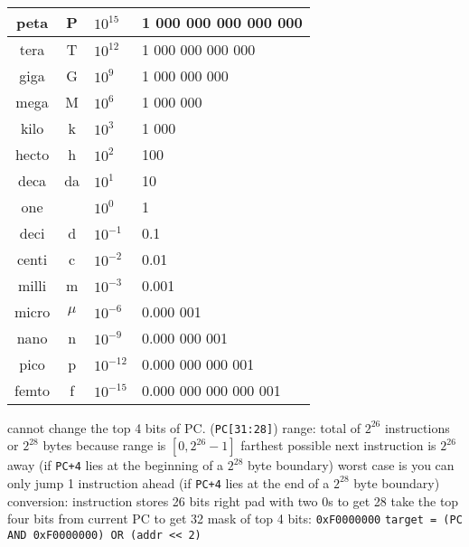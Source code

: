 \documentclass[12pt]{article}
\begin{document}
\begin{spacing}{0.9}
\begin{multicols*}{2}
\begin{flushleft}
\begin{outline}[longenum]
 \\
\begin{tabular}{|c c l l|}                                   \hline
peta  & P     & $10^{ 15}$ & \hfill 1 000 000 000 000 000 \\ \hline
tera  & T     & $10^{ 12}$ & \hfill     1 000 000 000 000 \\ \hline
giga  & G     & $10^{  9}$ & \hfill         1 000 000 000 \\ \hline
mega  & M     & $10^{  6}$ & \hfill             1 000 000 \\ \hline
kilo  & k     & $10^{  3}$ & \hfill                 1 000 \\ \hline
hecto & h     & $10^{  2}$ & \hfill                   100 \\ \hline
deca  & da    & $10^{  1}$ & \hfill                    10 \\ \hline
one   &       & $10^{ 0 }$ & \hfill       1 \hfill \hfill \\ \hline
deci  & d     & $10^{- 1}$ & 0.1                          \\ \hline
centi & c     & $10^{- 2}$ & 0.01                         \\ \hline
milli & m     & $10^{- 3}$ & 0.001                        \\ \hline
micro & $\mu$ & $10^{- 6}$ & 0.000 001                    \\ \hline
nano  & n     & $10^{- 9}$ & 0.000 000 001                \\ \hline
pico  & p     & $10^{-12}$ & 0.000 000 000 001            \\ \hline
femto & f     & $10^{-15}$ & 0.000 000 000 000 001        \\ \hline
\end{tabular}

  \1 cannot change the top 4 bits of PC. (\verb|PC[31:28]|)
  \1 range:
    \2 total of $2^{26}$ instructions or $2^{28}$ bytes
      \3 because range is $[0,2^{26}-1]$
    \2 farthest possible next instruction is $2^{26}$ away (if \verb|PC+4| lies at the beginning of a $2^{28}$ byte boundary)
    \2 worst case is you can only jump 1 instruction ahead (if \verb|PC+4| lies at the end of a $2^{28}$ byte boundary)
  \1 conversion:
    \2 instruction stores 26 bits
    \2 right pad with two 0s to get 28
    \2 take the top four bits from current PC to get 32
  \1 mask of top 4 bits: \verb|0xF0000000|
  \1 \verb|target = (PC AND 0xF0000000) OR (addr << 2)|


\end{outline}
\end{flushleft}
\end{multicols*}
\end{spacing}
\end{document}
